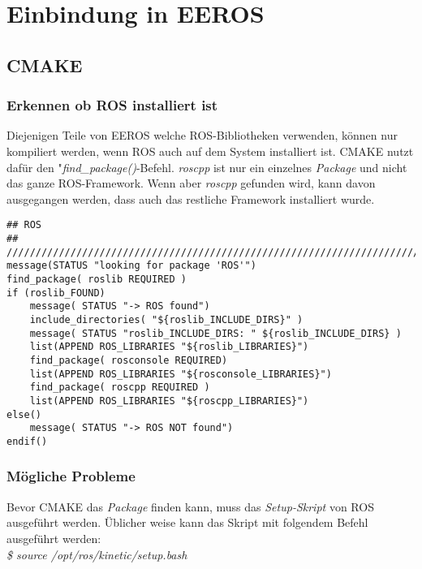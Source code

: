 \chapter{Einbindung in EEROS}


\section{CMAKE}
\subsection{Erkennen ob ROS installiert ist}
Diejenigen Teile von EEROS welche ROS-Bibliotheken verwenden, können nur kompiliert werden, wenn ROS auch auf dem System installiert ist.
CMAKE nutzt dafür den "\textit{find\_package()}-Befehl.
\textit{roscpp} ist nur ein  einzelnes \textit{Package} und nicht das ganze ROS-Framework.
Wenn aber \textit{roscpp} gefunden wird, kann davon ausgegangen werden, dass auch das restliche Framework installiert wurde.

\lstset{language=c}
\begin{lstlisting}
## ROS	
## ////////////////////////////////////////////////////////////////////////
message(STATUS "looking for package 'ROS'")
find_package( roslib REQUIRED )
if (roslib_FOUND)
	message( STATUS "-> ROS found")
	include_directories( "${roslib_INCLUDE_DIRS}" )
	message( STATUS "roslib_INCLUDE_DIRS: " ${roslib_INCLUDE_DIRS} )
	list(APPEND ROS_LIBRARIES "${roslib_LIBRARIES}")
	find_package( rosconsole REQUIRED)
	list(APPEND ROS_LIBRARIES "${rosconsole_LIBRARIES}")
	find_package( roscpp REQUIRED )
	list(APPEND ROS_LIBRARIES "${roscpp_LIBRARIES}")
else()
	message( STATUS "-> ROS NOT found")
endif()
\end{lstlisting}

\subsection{Mögliche Probleme}
Bevor CMAKE das \textit{Package} finden kann, muss das \textit{Setup-Skript} von ROS ausgeführt werden.
Üblicher weise kann das Skript mit folgendem Befehl ausgeführt werden:\\
\textit{\$ source /opt/ros/kinetic/setup.bash}

